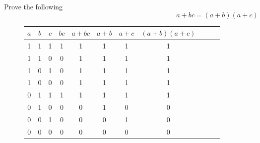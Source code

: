 \documentclass[11pt]{article}
\begin{document}
\begin{question}
	Prove the following
	\begin{equation}
		a+bc = (a+b)(a+c)
	\end{equation}

	\begin{figure}[h]
		\begin{center}
			\begin{tabular} { c c c | c c c c c c c c }
				$a$ & $b$ & $c$ & $bc$ & $a+bc$ & $a+b$ & $a+c$ & $(a+b)(a+c)$ \\
				\hline
				1 & 1 & 1 & 1 & 1 & 1 & 1 & 1 \\
				1 & 1 & 0 & 0 & 1 & 1 & 1 & 1 \\
				1 & 0 & 1 & 0 & 1 & 1 & 1 & 1 \\
				1 & 0 & 0 & 0 & 1 & 1 & 1 & 1 \\
				0 & 1 & 1 & 1 & 1 & 1 & 1 & 1 \\
				0 & 1 & 0 & 0 & 0 & 1 & 0 & 0 \\
				0 & 0 & 1 & 0 & 0 & 0 & 1 & 0 \\
				0 & 0 & 0 & 0 & 0 & 0 & 0 & 0 \\
			\end{tabular}
		\end{center}
	\end{figure}
\end{question}
\end{document}
